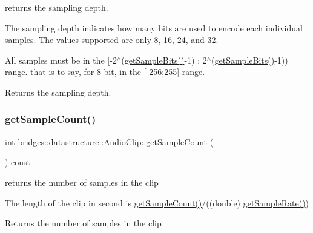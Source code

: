 returns the sampling depth. 

The sampling depth indicates how many bits are used to encode each individual samples. The values supported are only 8, 16, 24, and 32.

All samples must be in the \mbox{[}-\/2$^\wedge$(\hyperlink{classbridges_1_1datastructure_1_1_audio_clip_aca7c5460d005d62a7a0d2eae595e63d3}{get\+Sample\+Bits()}-\/1) ; 2$^\wedge$(\hyperlink{classbridges_1_1datastructure_1_1_audio_clip_aca7c5460d005d62a7a0d2eae595e63d3}{get\+Sample\+Bits()}-\/1)) range. that is to say, for 8-\/bit, in the \mbox{[}-\/256;255\mbox{]} range.

\begin{DoxyReturn}{Returns}
the sampling depth. 
\end{DoxyReturn}
\mbox{\label{classbridges_1_1datastructure_1_1_audio_clip_aaaee4b34cd512c02a0c0ea072782a9d6}} 
\subsubsection{\texorpdfstring{get\+Sample\+Count()}{getSampleCount()}}
{\footnotesize\ttfamily int bridges\+::datastructure\+::\+Audio\+Clip\+::get\+Sample\+Count (\begin{DoxyParamCaption}{ }\end{DoxyParamCaption}) const\hspace{0.3cm}{\ttfamily [inline]}}



returns the number of samples in the clip 

The length of the clip in second is \hyperlink{classbridges_1_1datastructure_1_1_audio_clip_aaaee4b34cd512c02a0c0ea072782a9d6}{get\+Sample\+Count()}/((double) \hyperlink{classbridges_1_1datastructure_1_1_audio_clip_a520e4a9bbe0685b3598d90668172618c}{get\+Sample\+Rate()})

\begin{DoxyReturn}{Returns}
the number of samples in the clip 
\end{DoxyReturn}
\mbox{\label{classbridges_1_1datastructure_1_1_audio_clip_a520e4a9bbe0685b3598d90668172618c}} 
